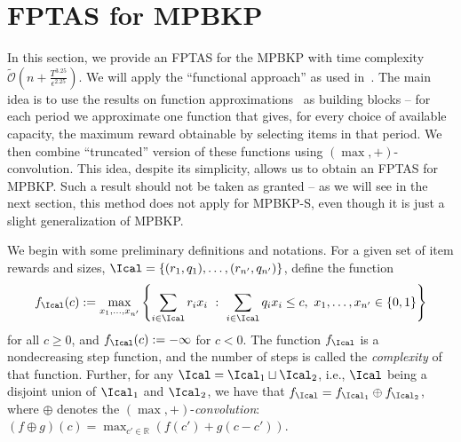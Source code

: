 \documentclass[11pt]{article}
\begin{document}
\section{FPTAS for MPBKP}\label{sec:MPBKP}
In this section, we provide an FPTAS for the MPBKP with time complexity $\tilde{\mathcal{O}}\left(n+\frac{T^{3.25}}{\epsilon^{2.25}}\right)$. We will apply the ``functional approach'' as used in~\cite{chan:OASIcs:2018:8299}. The main idea is to use the results on function approximations~\citep{chan:OASIcs:2018:8299,jin:LIPIcs:2019:10652} as building blocks -- for each period we approximate one function that gives, for every choice of available capacity, the maximum reward obtainable by selecting items in that period. We then combine ``truncated'' version of these functions using $(\max,+)$-convolution. This idea, despite its simplicity, allows us to obtain an FPTAS for MPBKP. Such a result should not be taken as granted -- as we will see in the next section, this method does not apply for MPBKP-S, even though it is just a slight generalization of MPBKP. 

We begin with some preliminary definitions and notations. For a given set of item rewards and sizes, $\Ical = \{(r_1,q_1), \ldots, (r_{n'}, q_{n'})\}$, define the function
\begin{align}\label{eqn:func}
f_\Ical(c) := \max_{x_1,\ldots,x_{n'}}\left\{\sum_{i\in\Ical}r_ix_i\ :\ \sum_{i\in\Ical}q_ix_i\le c, \ x_1,\ldots,x_{n'}\in\{0,1\}\right\}
\end{align}
for all $c\ge 0$, and $f_\Ical(c) := -\infty$ for $c<0$. The function $f_\Ical$ is a nondecreasing step function, and the number of steps is called the \emph{complexity} of that function. Further, for any $\Ical = \Ical_1\sqcup \Ical_2$, i.e., $\Ical$ being a disjoint union of $\Ical_1$ and $\Ical_2$, we have that $f_\Ical = f_{\Ical_1}\oplus f_{\Ical_2}$, where $\oplus$ denotes the $(\max,+)$-\emph{convolution}: $(f\oplus g)(c) = \max_{c'\in\mathbb{R}}\left(f(c')+g(c-c')\right)$.
\end{document}
